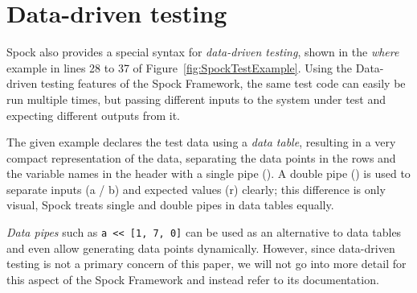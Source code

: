 \section{Data-driven testing}
Spock also provides a special syntax for \textit{data-driven testing},
shown in the \textit{where} example
in lines 28 to 37 of Figure~\ref{fig:SpockTestExample}.
Using the Data-driven testing features of the Spock Framework,
the same test code can easily be run multiple times,
but passing different inputs to the system under test
and expecting different outputs from it.
\autocite[Chapter: Data Driven Testing]{SpockFrameworkDoc}

The given example declares the test data using a \textit{data table},
resulting in a very compact representation of the data,
separating the data points in the rows
and the variable names in the header
with a single pipe (\code{|}).
A double pipe (\code{||}) is used to separate
inputs (a / b) and expected values (r) clearly;
this difference is only visual,
Spock treats single and double pipes in data tables equally.
\autocite[Chapter: Data Driven Testing - Syntactic Variations]{SpockFrameworkDoc}

\textit{Data pipes} such as \texttt{a << [1, 7, 0]}
can be used as an alternative to data tables and even
allow generating data points dynamically.
However, since data-driven testing is not a primary concern of this paper,
we will not go into more detail for this aspect of the Spock Framework
and instead refer to its documentation.
\autocite{SpockFrameworkDoc}
